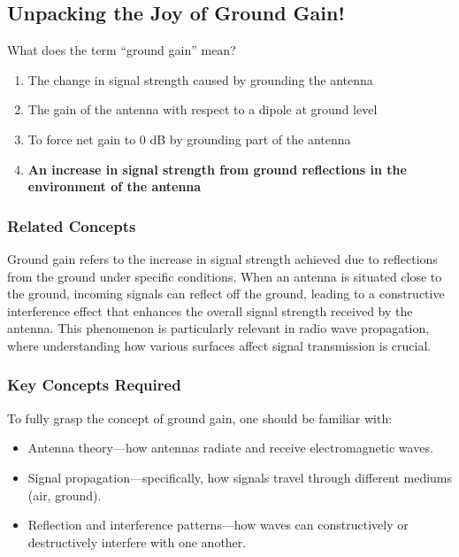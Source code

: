 \subsection{Unpacking the Joy of Ground Gain!}

\begin{tcolorbox}[colback=gray!10, colframe=black, title=E9A05] What does the term “ground gain” mean?
\begin{enumerate}[label=\Alph*.]
    \item The change in signal strength caused by grounding the antenna
    \item The gain of the antenna with respect to a dipole at ground level
    \item To force net gain to 0 dB by grounding part of the antenna
    \item \textbf{An increase in signal strength from ground reflections in the environment of the antenna}
\end{enumerate} \end{tcolorbox}

\subsubsection{Related Concepts}

Ground gain refers to the increase in signal strength achieved due to reflections from the ground under specific conditions. When an antenna is situated close to the ground, incoming signals can reflect off the ground, leading to a constructive interference effect that enhances the overall signal strength received by the antenna. This phenomenon is particularly relevant in radio wave propagation, where understanding how various surfaces affect signal transmission is crucial.

\subsubsection{Key Concepts Required}

To fully grasp the concept of ground gain, one should be familiar with:
\begin{itemize}
    \item Antenna theory—how antennas radiate and receive electromagnetic waves.
    \item Signal propagation—specifically, how signals travel through different mediums (air, ground).
    \item Reflection and interference patterns—how waves can constructively or destructively interfere with one another.
\end{itemize}

